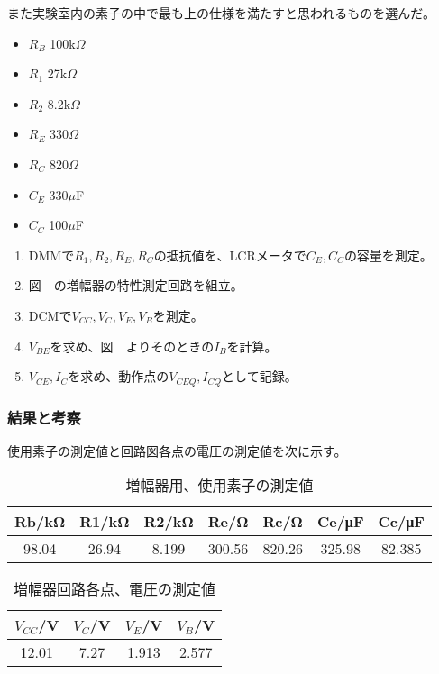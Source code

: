 \documentclass[11pt,a4j,titlepage]{jsarticle}
\begin{document}
  また実験室内の素子の中で最も上の仕様を満たすと思われるものを選んだ。
  \begin{itemize}
   \item $R_B$ 100k$\Omega$
   \item $R_1$ 27k$\Omega$
   \item $R_2$ 8.2k$\Omega$
   \item $R_E$ 330$\Omega$
   \item $R_C$ 820$\Omega$
   \item $C_E$ 330$\mu$F
   \item $C_C$ 100$\mu$F
  \end{itemize}
  
  \begin{enumerate}
   \item DMMで$R_1,R_2,R_E,R_C$の抵抗値を、LCRメータで$C_E,C_C$の容量を測定。
   \item 図\ \ の増幅器の特性測定回路を組立。
   \item DCMで$V_{CC},V_C,V_E,V_B$を測定。
   \item $V_{BE}$を求め、図\ \ よりそのときの$I_B$を計算。
   \item $V_{CE},I_C$を求め、動作点の$V_{CEQ},I_{CQ}$として記録。
  \end{enumerate}
  

  
  
   \subsubsection{結果と考察}
   
   使用素子の測定値と回路図各点の電圧の測定値を次に示す。
 
 \begin{table}[htb]
  \begin{center}
    \caption{増幅器用、使用素子の測定値}
    \begin{tabular}{ccccccc} \toprule
Rb/kΩ	&	R1/kΩ	&	R2/kΩ	&	Re/Ω	&	Rc/Ω	&	Ce/μF	&	Cc/μF	\\ \midrule
98.04	&	26.94	&	8.199	&	300.56	&	820.26	&	325.98	&	82.385	\\ \bottomrule
    \end{tabular}
    \label{tab:price}
  \end{center}
\end{table}

 
 \begin{table}[htb]
  \begin{center}
    \caption{増幅器回路各点、電圧の測定値}
    \begin{tabular}{cccc} \toprule
$V_{CC}$/V	&	$V_C$/V	&	$V_E$/V	&	$V_B$/V	\\ \midrule
12.01	&	7.27	&	1.913	&	2.577	\\ \bottomrule
    \end{tabular}
    \label{tab:price}
  \end{center}
\end{table}
\end{document}
